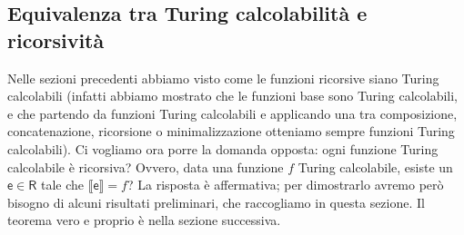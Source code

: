 



\subsection{Equivalenza tra Turing calcolabilità e ricorsività}

Nelle sezioni precedenti abbiamo visto come le funzioni ricorsive siano Turing calcolabili
(infatti abbiamo mostrato che le funzioni base sono Turing calcolabili,
e che partendo da funzioni Turing calcolabili e applicando una tra composizione,
concatenazione, ricorsione o minimalizzazione otteniamo sempre funzioni Turing calcolabili).
Ci vogliamo ora porre la domanda opposta: ogni funzione Turing calcolabile è ricorsiva? Ovvero,
data una funzione $f$ Turing calcolabile, esiste un $\mathsf e\in\mathsf R$ tale che $\llbracket\mathsf e\rrbracket=f$?
La risposta è affermativa; per dimostrarlo avremo però bisogno di alcuni risultati preliminari,
che raccogliamo in questa sezione. Il teorema vero e proprio è nella sezione successiva.

